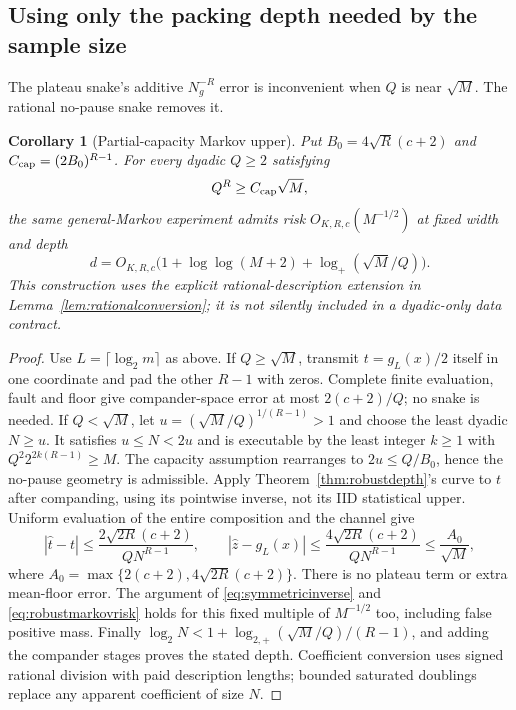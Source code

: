 \documentclass[11pt,letterpaper]{article}
\newtheorem{corollary}[theorem]{Corollary}
\theoremstyle{definition}\newtheorem{definition}[theorem]{Definition}
\theoremstyle{remark}\newtheorem{remark}[theorem]{Remark}
\begin{document}
\subsection{Using only the packing depth needed by the sample size}
The plateau snake's additive $N_g^{-R}$ error is inconvenient when $Q$ is near $\sqrt M$. The rational no-pause snake removes it.
\begin{corollary}[Partial-capacity Markov upper]\label{cor:markovpartial}
Put $B_0=4\sqrt R(c+2)$ and $C_{\rm cap}=(2B_0)^{R-1}$. For every dyadic $Q\ge2$ satisfying
\[
 Q^R\ge C_{\rm cap}\sqrt M,
\]
the same general-Markov experiment admits risk $O_{K,R,c}(M^{-1/2})$ at fixed width and depth
\[
 d=O_{K,R,c}\bigl(1+\log\log(M+2)+\log_+(\sqrt M/Q)\bigr).
\]
This construction uses the explicit rational-description extension in Lemma~\ref{lem:rationalconversion}; it is not silently included in a dyadic-only data contract.
\end{corollary}
\begin{proof}
Use $L=\lceil\log_2m\rceil$ as above. If $Q\ge\sqrt M$, transmit $t=g_L(x)/2$ itself in one coordinate and pad the other $R-1$ with zeros. Complete finite evaluation, fault and floor give compander-space error at most $2(c+2)/Q$; no snake is needed.
If $Q<\sqrt M$, let $u=(\sqrt M/Q)^{1/(R-1)}>1$ and choose the least dyadic $N\ge u$. It satisfies $u\le N<2u$ and is executable by the least integer $k\ge1$ with $Q^2 2^{2k(R-1)}\ge M$. The capacity assumption rearranges to $2u\le Q/B_0$, hence the no-pause geometry is admissible. Apply Theorem~\ref{thm:robustdepth}'s curve to $t$ after companding, using its pointwise inverse, not its IID statistical upper. Uniform evaluation of the entire composition and the channel give
\[
 |\widehat t-t|\le\frac{2\sqrt{2R}(c+2)}{QN^{R-1}},\qquad
 |\widehat z-g_L(x)|\le\frac{4\sqrt{2R}(c+2)}{QN^{R-1}}
 \le\frac{A_0}{\sqrt M},
\]
where $A_0=\max\{2(c+2),4\sqrt{2R}(c+2)\}$. There is no plateau term or extra mean-floor error. The argument of \eqref{eq:symmetricinverse} and \eqref{eq:robustmarkovrisk} holds for this fixed multiple of $M^{-1/2}$ too, including false positive mass. Finally
$\log_2N<1+\log_{2,+}(\sqrt M/Q)/(R-1)$, and adding the compander stages proves the stated depth. Coefficient conversion uses signed rational division with paid description lengths; bounded saturated doublings replace any apparent coefficient of size $N$.
\end{proof}
\end{document}
